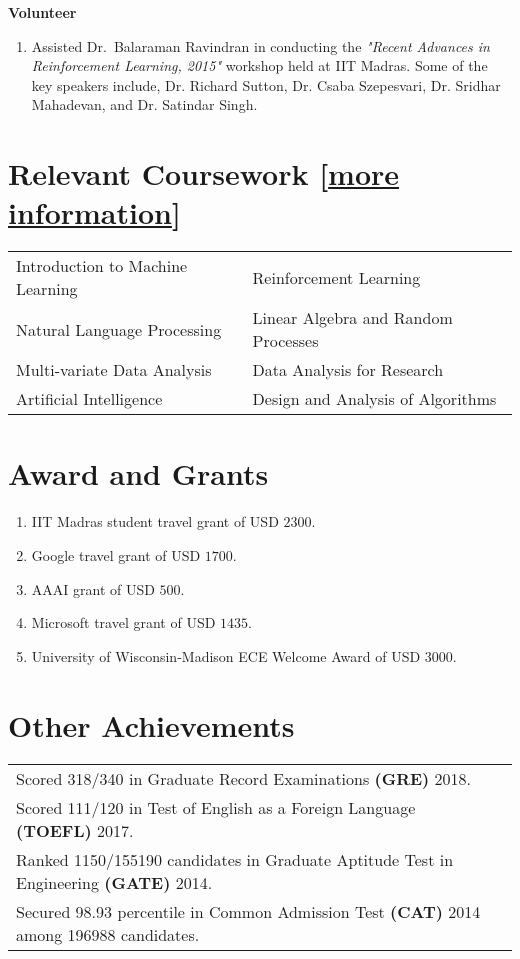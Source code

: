 \documentclass[margin,11pt]{res}
\begin{document}
\begin{resume}
\textbf{Volunteer} 
\begin{enumerate}
\item Assisted Dr.~Balaraman Ravindran in conducting the \textit{"Recent Advances in Reinforcement Learning, 2015"} workshop held at IIT Madras. Some of the key speakers include, Dr. Richard Sutton, Dr. Csaba Szepesvari, Dr. Sridhar Mahadevan, and Dr. Satindar Singh.
\end{enumerate}


\section{Relevant Coursework [\href{https://github.com/Subhojyoti/subhojyoti.github.io/blob/master/pdf/Courses\%20Information.pdf}{more information}]}
\begin{tabular}{ll}
Introduction to Machine Learning & Reinforcement Learning  \\
Natural Language Processing & Linear Algebra and Random Processes \\
Multi-variate Data Analysis & Data Analysis for Research \\
Artificial Intelligence & Design and Analysis of Algorithms \\
\end{tabular}

\section{Award and Grants}
\begin{enumerate}
\item  IIT Madras student travel grant of USD $2300$.
\item Google travel grant of USD $1700$.
\item AAAI grant of USD $500$.
\item Microsoft travel grant of USD $1435$.
\item University of Wisconsin-Madison ECE Welcome Award of USD $3000$.
\end{enumerate}


\section{Other Achievements}
\begin{tabular}{p{12cm}p{80cm}}
Scored 318/340 in Graduate Record Examinations \textbf{(GRE)} 2018.\\
Scored 111/120 in Test of English as a Foreign Language \textbf{(TOEFL)} 2017.\\
Ranked 1150/155190 candidates in Graduate Aptitude Test in Engineering \textbf{(GATE)} 2014. \\
Secured 98.93 percentile in Common Admission Test \textbf{(CAT)} 2014 among 196988 candidates.
\end{tabular}


\end{resume}
\end{document}

